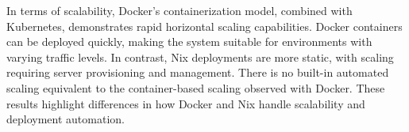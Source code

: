 In terms of scalability, Docker’s containerization model, combined with Kubernetes,
demonstrates rapid horizontal scaling capabilities. Docker containers can be deployed
quickly, making the system suitable for environments with varying traffic levels. In contrast,
Nix deployments are more static, with scaling requiring server provisioning and management.
There is no built-in automated scaling equivalent to the container-based scaling observed
with Docker. These results highlight differences in how Docker and Nix handle scalability
and deployment automation.
